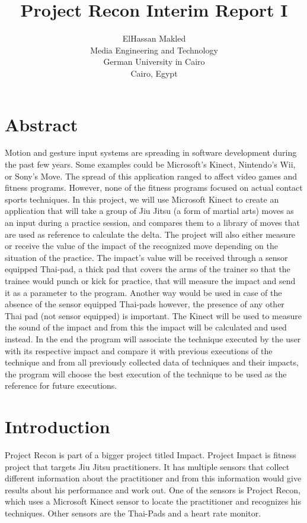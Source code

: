 \documentclass[11pt]{article} %
\title{Project Recon Interim Report I}
\author{ElHassan Makled\\Media Engineering and Technology\\ German University in Cairo\\ Cairo, Egypt}
\begin{document}
\maketitle
\pagebreak
\section{Abstract}
Motion and gesture input systems are spreading in software development during the past few years. Some examples could be Microsoft's Kinect, Nintendo's Wii, or Sony's Move.
The spread of this application ranged to affect video games and fitness programs. However, none of the fitness programs focused on actual contact sports techniques.
In this project, we will use Microsoft Kinect to create an application that will take a group of Jiu Jitsu (a form of martial arts) moves as an input during a practice session,
and compares them to a library of moves that are used as reference to calculate the delta.
The project will also either measure or receive the value of the impact of the recognized move depending on the
situation of the practice. The impact's value will be received through a sensor equipped Thai-pad, a thick pad that covers the arms of the trainer so that the trainee would punch or kick for practice, that will measure the impact and send it as a parameter to the program. Another way would be used in case of the absence of the sensor equipped Thai-pads however, the presence of any other Thai pad (not sensor equipped) is important. The Kinect will be used to measure the sound of the impact and from this the impact will be calculated and used instead. In the end the program will associate the technique executed by the user with its respective impact and compare it with previous executions of the technique and from all previously collected data of techniques and their impacts, the program will choose the best execution of the technique to be used as the reference for future executions.
\section{Introduction}
Project Recon is part of a bigger project titled Impact. Project Impact is fitness project that targets Jiu Jitsu practitioners. It has multiple sensors that collect different information about the practitioner and from this information would give results about his performance and work out. One of the sensors is Project Recon, which uses a Microsoft Kinect sensor to locate the practitioner and recognizes his techniques. Other sensors are the Thai-Pads and a heart rate monitor.
\end{document}
